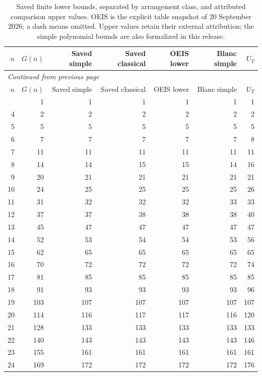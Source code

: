 
\begingroup
\small
\setlength{\tabcolsep}{6pt}
\begin{longtable}{rrrrrrr}
\caption{Saved finite lower bounds, separated by arrangement class, and attributed comparison upper values. OEIS is the explicit table snapshot of 20 September 2026; a dash means omitted. Upper values retain their external attribution; the simple polynomial bounds are also formalized in this release.}\label{exp:finite-table}\\
\toprule
$n$ & $G(n)$ & Saved simple & Saved classical & OEIS lower & Blanc simple & $U_T$\\
\midrule
\endfirsthead
\multicolumn{7}{l}{\small\itshape Continued from previous page}\\
\toprule
$n$ & $G(n)$ & Saved simple & Saved classical & OEIS lower & Blanc simple & $U_T$\\
\midrule
\endhead
\midrule
\endfoot
\bottomrule
\endlastfoot
3 & 1 & 1 & 1 & 1 & 1 & 1 \\
4 & 2 & 2 & 2 & 2 & 2 & 2 \\
5 & 5 & 5 & 5 & 5 & 5 & 5 \\
6 & 7 & 7 & 7 & 7 & 7 & 8 \\
7 & 11 & 11 & 11 & 11 & 11 & 11 \\
8 & 14 & 14 & 15 & 15 & 14 & 16 \\
9 & 20 & 21 & 21 & 21 & 21 & 21 \\
10 & 24 & 25 & 25 & 25 & 25 & 26 \\
11 & 31 & 32 & 32 & 32 & 33 & 33 \\
12 & 37 & 37 & 38 & 38 & 38 & 40 \\
13 & 45 & 47 & 47 & 47 & 47 & 47 \\
14 & 52 & 53 & 54 & 54 & 53 & 56 \\
15 & 62 & 65 & 65 & 65 & 65 & 65 \\
16 & 70 & 72 & 72 & 72 & 72 & 74 \\
17 & 81 & 85 & 85 & 85 & 85 & 85 \\
18 & 91 & 93 & 93 & 93 & 93 & 96 \\
19 & 103 & 107 & 107 & 107 & 107 & 107 \\
20 & 114 & 116 & 117 & 117 & 116 & 120 \\
21 & 128 & 133 & 133 & 133 & 133 & 133 \\
22 & 140 & 143 & 143 & 143 & 143 & 146 \\
23 & 155 & 161 & 161 & 161 & 161 & 161 \\
24 & 169 & 172 & 172 & 172 & 172 & 176 \\

\end{longtable}
